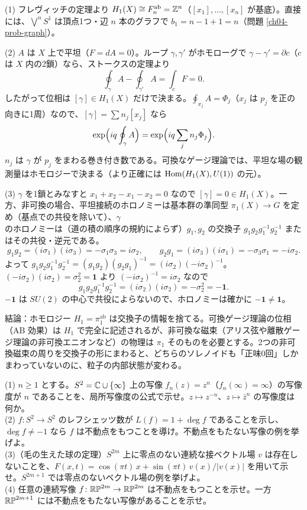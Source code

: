\begin{solution}
(1) フレヴィッチの定理より $H_1(X)\cong F_n^{\mathrm{ab}}=\mathbb{Z}^n$（$[x_1],\dots,[x_n]$ が基底）。直接には、$\bigvee^nS^1$ は頂点1つ・辺 $n$ 本のグラフで $b_1=n-1+1=n$（問題 \ref{ch04-prob-graph}）。

(2) $A$ は $X$ 上で平坦（$F=dA=0$）。ループ $\gamma,\gamma'$ がホモローグで $\gamma-\gamma'=\partial c$（$c$ は $X$ 内の2鎖）なら、ストークスの定理より
\[
\oint_\gamma A-\oint_{\gamma'}A=\int_cF=0 .
\]
したがって位相は $[\gamma]\in H_1(X)$ だけで決まる。$\oint_{x_j}A=\Phi_j$（$x_j$ は $p_j$ を正の向きに1周）なので、$[\gamma]=\sum n_j[x_j]$ なら
\[
\exp\Bigl(iq\oint_\gamma A\Bigr)=\exp\Bigl(iq\sum_jn_j\Phi_j\Bigr).
\]
$n_j$ は $\gamma$ が $p_j$ をまわる巻き付き数である。可換なゲージ理論では、平坦な場の観測量はホモロジーで決まる（より正確には $\operatorname{Hom}(H_1(X),U(1))$ の元）。

(3) $\gamma$ を1鎖とみなすと $x_1+x_2-x_1-x_2=0$ なので $[\gamma]=0\in H_1(X)$。一方、非可換の場合、平坦接続のホロノミーは基本群の準同型 $\pi_1(X)\to G$ を定め（基点での共役を除いて）、$\gamma$ のホロノミーは（道の積の順序の規約によらず）$g_1,g_2$ の交換子 $g_1g_2g_1^{-1}g_2^{-1}$ またはその共役・逆元である。
\[
g_1g_2=(i\sigma_1)(i\sigma_3)=-\sigma_1\sigma_3=i\sigma_2,\qquad g_2g_1=(i\sigma_3)(i\sigma_1)=-\sigma_3\sigma_1=-i\sigma_2 .
\]
よって $g_1g_2g_1^{-1}g_2^{-1}=(g_1g_2)(g_2g_1)^{-1}=(i\sigma_2)(-i\sigma_2)^{-1}$。$(-i\sigma_2)(i\sigma_2)=\sigma_2^2=\mathbf 1$ より $(-i\sigma_2)^{-1}=i\sigma_2$ なので
\[
g_1g_2g_1^{-1}g_2^{-1}=(i\sigma_2)(i\sigma_2)=-\sigma_2^2=-\mathbf 1 .
\]
$-\mathbf 1$ は $SU(2)$ の中心で共役によらないので、ホロノミーは確かに $-\mathbf 1\ne\mathbf 1$。

結論：ホモロジー $H_1=\pi_1^{\mathrm{ab}}$ は交換子の情報を捨てる。可換ゲージ理論の位相（AB 効果）は $H_1$ で完全に記述されるが、非可換な磁束（アリス弦や離散ゲージ理論の非可換エニオンなど）の物理は $\pi_1$ そのものを必要とする。2つの非可換磁束の周りを交換子の形にまわると、どちらのソレノイドも「正味0回」しかまわっていないのに、粒子の内部状態が変わる。
\end{solution}

\begin{problem}[難易度 D]\label{ch04-prob-degree}
(1) $n\ge1$ とする。$S^2=\mathbb{C}\cup\{\infty\}$ 上の写像 $f_n(z)=z^n$（$f_n(\infty)=\infty$）の写像度が $n$ であることを、局所写像度の公式で示せ。$z\mapsto z^{-n}$、$z\mapsto\bar z^n$ の写像度は何か。\\
(2) $f\colon S^2\to S^2$ のレフシェッツ数が $L(f)=1+\deg f$ であることを示し、$\deg f\ne-1$ なら $f$ は不動点をもつことを導け。不動点をもたない写像の例を挙げよ。\\
(3)（毛の生えた球の定理）$S^{2m}$ 上に零点のない連続な接ベクトル場 $v$ は存在しないことを、$F(x,t)=\cos(\pi t)\,x+\sin(\pi t)\,v(x)/\lvert v(x)\rvert$ を用いて示せ。$S^{2m+1}$ では零点のないベクトル場の例を挙げよ。\\
(4) 任意の連続写像 $f\colon\mathbb{RP}^{2m}\to\mathbb{RP}^{2m}$ は不動点をもつことを示せ。一方 $\mathbb{RP}^{2m+1}$ には不動点をもたない写像があることを示せ。
\end{problem}

